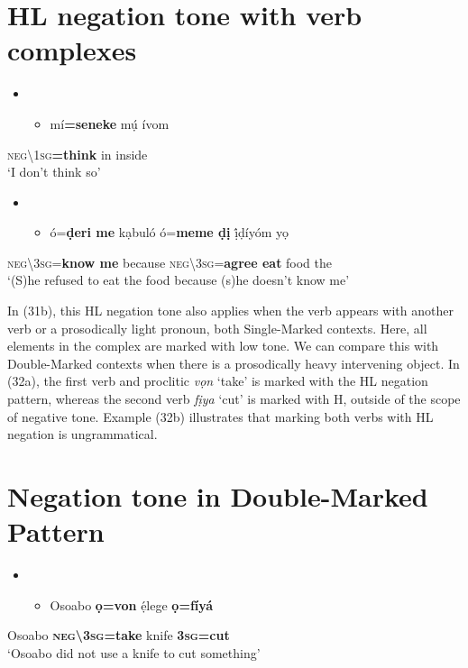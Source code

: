 \chapter[HL negation tone with verb complexes ]{HL negation tone with verb complexes\textit{ }}
\begin{itemize}
\item \setcounter{itemize}{0}
\begin{itemize}
\item \gll mí\textbf{=seneke}      mụ́   ívom\\
\end{itemize}
\end{itemize}
     \textsc{neg{\textbackslash}1sg}\textbf{=think}    in   inside\\
\glt ‘I don’t think so’ \citep[32]{Kari2004}
\z

\begin{itemize}
\item \setcounter{itemize}{0}
\begin{itemize}
\item \gll ó=\textbf{ḍeri       me}   kạbuló   ó=\textbf{meme     ḍị}   ị́ḍíyóm   yọ\\
\end{itemize}
\end{itemize}
     \textsc{neg{\textbackslash}3sg}=\textbf{know  me}    because   \textsc{neg{\textbackslash}3sg}=\textbf{agree   eat}   food   the\\
\glt ‘(S)he refused to eat the food because (s)he doesn’t know me’ \citep[45]{Kari2004}  
\z

In (31b), this HL negation tone also applies when the verb appears with another verb or a prosodically light pronoun, both Single-Marked contexts. Here, all elements in the complex are marked with low tone. We can compare this with Double-Marked contexts when there is a prosodically heavy intervening object. In (32a), the first verb and proclitic \textit{vọn} ‘take’ is marked with the HL negation pattern, whereas the second verb \textit{fịya} ‘cut’ is marked with H, outside of the scope of negative tone. Example (32b) illustrates that marking both verbs with HL negation is ungrammatical. 

\chapter[Negation tone in Double{}-Marked Pattern]{Negation tone in Double-Marked Pattern}
\begin{itemize}
\item \setcounter{itemize}{0}
\begin{itemize}
\item \gll Osoabo   \textbf{ọ=von}       ẹ́lege   \textbf{ọ=fíyá}\\
\end{itemize}
\end{itemize}
     Osoabo   \textbf{\textsc{neg{\textbackslash}3sg}}\textbf{=take}   knife   \textbf{3}\textbf{\textsc{sg}}\textbf{=cut}\\
\glt ‘Osoabo did not use a knife to cut something’ \citep[111]{Kari2004}
\z

